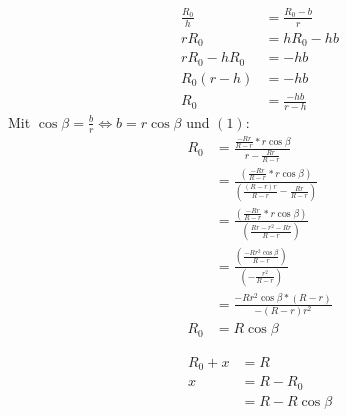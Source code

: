 \begin{align*}
	\frac{R_0}{h} &= \frac{R_0-b}{r} \\
	r R_0 &= h R_0 - hb \\
	r R_0 - h R_0 &= -hb \\
	R_0 (r-h) &= -hb \\
	R_0 &= \frac{-hb}{r-h}
\end{align*}
Mit $ \cos\beta = \frac{b}{r} \Leftrightarrow b = r \cos\beta $ und $(1)$:
\begin{align*}
	R_0 &= \frac{\frac{-Rr}{R-r}*r \cos\beta}{r-\frac{Rr}{R-r}} \\
	&= \frac{\left(\frac{-Rr}{R-r}*r \cos\beta\right)}{\left(\frac{(R-r)r}{R-r}-\frac{Rr}{R-r}\right)} \\
	&= \frac{\left(\frac{-Rr}{R-r}*r \cos\beta\right)}{\left(\frac{Rr-r^2-Rr}{R-r}\right)} \\
	&= \frac{\left(\frac{-Rr^2 \cos\beta}{R-r}\right)}{\left(-\frac{r^2}{R-r}\right)} \\
	&= \frac{-Rr^2 \cos\beta * (R-r)}{-(R-r)r^2} \\
	R_0 &= R \cos\beta
\end{align*}

\begin{align*}
	R_0 + x &= R \\
	x &= R - R_0 \\
	&= R - R \cos\beta \tag{3}
\end{align*}


